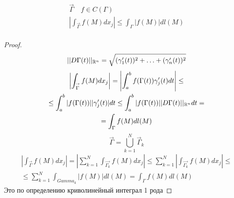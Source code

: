\documentclass[main]{subfiles}
\begin{document}
\begin{theorem}
    \begin{gather*}
        \stackrel{\rightarrow}{\Gamma} \quad f \in C(\Gamma) \\
        \left| \int_{\stackrel{\rightarrow}{\Gamma}} f(M) dx_j \right| \leq \int_\Gamma |f(M)|dl(M) \\
    \end{gather*}
\end{theorem}
\begin{proof}
    \begin{gather*}
        ||D\Gamma(t)||_{{\mathbb{R}^n}} = \sqrt{(\gamma_1^\prime(t))^2 + \ldots + (\gamma^\prime_n(t))^2} 
    \end{gather*}
    \begin{multline*}
        \left| \int_{\stackrel{\rightarrow}{\Gamma}} f(M) dx_j \right| = \left| \int^b_a f(\Gamma(t))\gamma^\prime_j(t) dt \right| \leq\\
        \leq \int^b_a | f(\Gamma(t)) | | \gamma^\prime_j(t)| dt \leq \int^b_a |f(\Gamma(t))||D\Gamma(t)||_{\mathbb{R}^n} dt = \\
        = \int_{\Gamma} f(M) dl(M) 
    \end{multline*}
    \[\stackrel{\rightarrow}{\Gamma} = \bigcup^N_{k=1} \stackrel{\rightarrow}{\Gamma}_k \] 
    \begin{multline*}
        \left| \int_{\stackrel{\rightarrow}{\Gamma}} f(M) dx_j \right| = \left| \sum^N_{k=1}
         \int_{\stackrel{\rightarrow}{\Gamma_k}} f(M)dx_j \right| \leq \sum^N_{k=1} 
         \left| \int_{\stackrel{\rightarrow}{\Gamma_k}} f(M)dx_j \right| \leq \\
         \leq \sum^N_{k=1}  \int_{Gamma_k} |f(M)|dl(M) = \int_{\Gamma} f(M)dl(M)
    \end{multline*}
    Это по определению криволинейный интеграл 1 рода
\end{proof}
\end{document}
